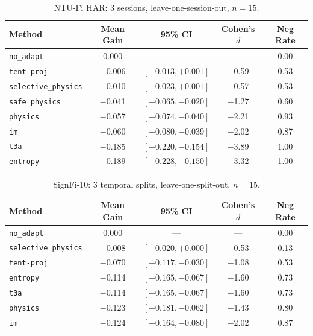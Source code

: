 \begin{table}[h]
\centering
\caption{NTU-Fi HAR: 3 sessions, leave-one-session-out, $n{=}15$.}
\label{tab:ntufi}
\small
\begin{tabular}{lcccc}
\toprule
\textbf{Method} & \textbf{Mean Gain} & \textbf{95\% CI} & \textbf{Cohen's $d$} & \textbf{Neg Rate} \\
\midrule
\texttt{no\_adapt} & 0.000 & --- & --- & 0.00 \\
\texttt{tent-proj} & $-$0.006 & $[-0.013, +0.001]$ & $-$0.59 & 0.53 \\
\texttt{selective\_physics} & $-$0.010 & $[-0.023, +0.001]$ & $-$0.57 & 0.53 \\
\texttt{safe\_physics} & $-$0.041 & $[-0.065, -0.020]$ & $-$1.27 & 0.60 \\
\texttt{physics} & $-$0.057 & $[-0.074, -0.040]$ & $-$2.21 & 0.93 \\
\texttt{im} & $-$0.060 & $[-0.080, -0.039]$ & $-$2.02 & 0.87 \\
\texttt{t3a} & $-$0.185 & $[-0.220, -0.154]$ & $-$3.89 & 1.00 \\
\texttt{entropy} & $-$0.189 & $[-0.228, -0.150]$ & $-$3.32 & 1.00 \\
\bottomrule
\end{tabular}
\end{table}

\begin{table}[h]
\centering
\caption{SignFi-10: 3 temporal splits, leave-one-split-out, $n{=}15$.}
\label{tab:signfi}
\small
\begin{tabular}{lcccc}
\toprule
\textbf{Method} & \textbf{Mean Gain} & \textbf{95\% CI} & \textbf{Cohen's $d$} & \textbf{Neg Rate} \\
\midrule
\texttt{no\_adapt} & 0.000 & --- & --- & 0.00 \\
\texttt{selective\_physics} & $-$0.008 & $[-0.020, +0.000]$ & $-$0.53 & 0.13 \\
\texttt{tent-proj} & $-$0.070 & $[-0.117, -0.030]$ & $-$1.08 & 0.53 \\
\texttt{entropy} & $-$0.114 & $[-0.165, -0.067]$ & $-$1.60 & 0.73 \\
\texttt{t3a} & $-$0.114 & $[-0.165, -0.067]$ & $-$1.60 & 0.73 \\
\texttt{physics} & $-$0.123 & $[-0.181, -0.062]$ & $-$1.43 & 0.80 \\
\texttt{im} & $-$0.124 & $[-0.164, -0.080]$ & $-$2.02 & 0.87 \\
\bottomrule
\end{tabular}
\end{table}

